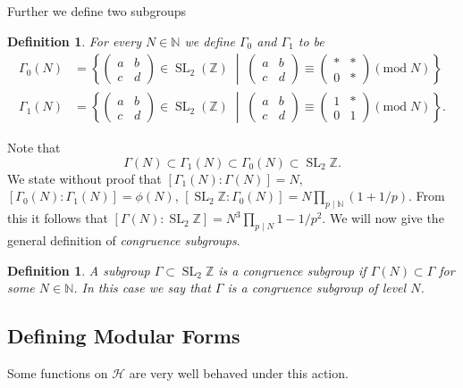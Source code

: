 \documentclass[a4paper]{article}
\theoremstyle{theoremdd}
\theoremstyle{definitiondd}
\newtheorem{definition}[theorem]{Definition}
\theoremstyle{remarkdd}
\newcommand{\N}{\mathbb{N}}
\newcommand{\Z}{\mathbb{Z}}
\newcommand{\bigset}[2]{ \left\{ #1 \;\middle|\; #2 \right\} }
\DeclareMathOperator{\SL}{SL}
\begin{document}
Further we define two subgroups
\begin{definition}
	For every $N \in \N$ we define $\Gamma_0$ and $\Gamma_1$ to be 
	\begin{align*}
		\Gamma_0(N) &= \bigset{\begin{pmatrix} a & b \\ c & d \end{pmatrix} \in \SL_2(\Z)}{\begin{pmatrix} a & b \\ c & d \end{pmatrix}  \equiv \begin{pmatrix} * & * \\ 0 & * \end{pmatrix}  (\mathrm{mod}\; N)} \\
		\Gamma_1(N) &= \bigset{\begin{pmatrix} a & b \\ c & d \end{pmatrix} \in \SL_2(\Z)}{\begin{pmatrix} a & b \\ c & d \end{pmatrix}  \equiv \begin{pmatrix} 1 & * \\ 0 & 1 \end{pmatrix}  (\mathrm{mod}\; N)}
	.\end{align*}
\end{definition} 
Note that 
\[
	\Gamma(N) \subset \Gamma_1(N) \subset \Gamma_0(N) \subset  \SL_2\Z
.\] 
We state without proof that $[\Gamma_1(N): \Gamma(N)] = N$, $[\Gamma_0 (N): \Gamma_1(N)]= \phi(N)$, $[\SL_2\Z: \Gamma_0(N)] = N \prod_{p \mathbin | \N}(1 + 1 /p)$. 
From this it follows that $[\Gamma(N): \SL_2\Z]= N^3 \prod_{p \mathbin | N} 1 - 1 /p^2$.
We will now give the general definition of \emph{congruence subgroups}. 
 \begin{definition}
	 A subgroup $\Gamma \subset \SL_2\Z$ is a \emph{congruence subgroup} if $\Gamma(N) \subset \Gamma$ for some $N \in \N$. In this case we say that $\Gamma$ is a congruence subgroup of level $N$. 
\end{definition}
\subsection{Defining Modular Forms}\label{sec:defining_modular_forms}

Some functions on $\mathcal{H} $ are very well behaved under this action. 
\end{document}
